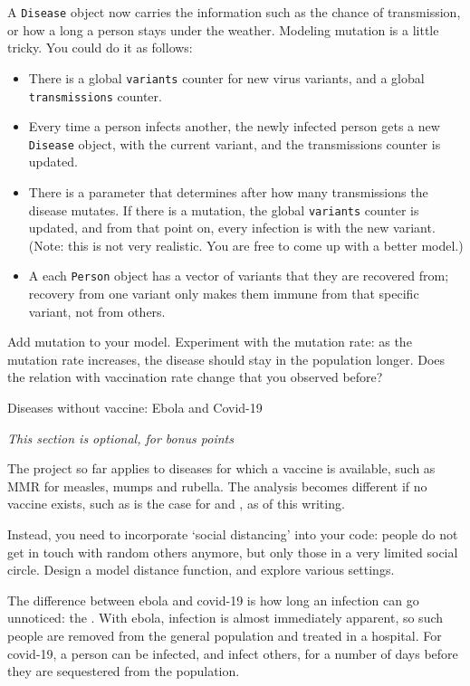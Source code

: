 A \lstinline{Disease} object now carries the information such as
the chance of transmission, or how a long a person stays under the weather.
Modeling mutation is a little tricky. You could do it as follows:
\begin{itemize}
\item There is a global \lstinline{variants} counter for new virus variants,
  and a global \lstinline{transmissions} counter.
\item Every time a person infects another, the newly infected person gets
  a new \lstinline{Disease} object, with the current variant,
  and the transmissions counter is updated.
\item There is a parameter that determines after how many transmissions the disease mutates.
  If there is a mutation, the global \lstinline{variants} counter is updated,
  and from that point on, every infection is with the new variant.
  (Note: this is not very realistic. You are free to come up with a better model.)
\item A each \lstinline{Person} object has a vector of variants that they are recovered from;
  recovery from one variant only makes them immune from that specific variant,
  not from others.
\end{itemize}

\begin{exercise}
  Add mutation to your model. Experiment with the mutation rate:
  as the mutation rate increases, the disease should stay in the population longer.
  Does the relation with vaccination rate change that you observed before?
\end{exercise}

 {Diseases without vaccine: Ebola and Covid-19}

\emph{This section is optional, for bonus points}

The project so far applies to diseases for which a vaccine is available,
such as MMR for measles, mumps and rubella.
The analysis becomes different if no vaccine exists, such
as is the case for  and ,
as of this writing.

Instead, you need to incorporate `social distancing' into your code:
people do not get in touch with random others anymore,
but only those in a very limited social circle.
Design a model distance function, and explore various settings.

The difference between ebola and covid-19 is how long an
infection can go unnoticed: the .
With ebola, infection is almost
immediately apparent, so such people are removed from the
general population and treated in a hospital.
For covid-19, a person can be infected, and infect others,
for a number of days before they are sequestered from the population.

